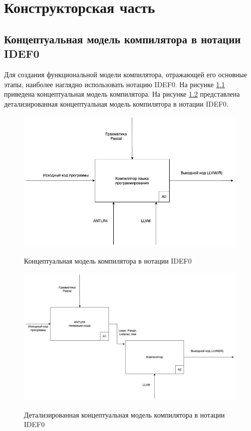 \chapter{Конструкторская часть}


\section{Концептуальная модель компилятора в нотации IDEF0}

Для создания функциональной модели компилятора, отражающей его основные этапы, наиболее наглядно использовать нотацию IDEF0. На рисунке \ref{fig:idef0-0} приведена концептуальная модель компилятора. На рисунке \ref{fig:idef0-1} представлена детализированная концептуальная модель компилятора в нотации IDEF0.

\begin{figure}[h!]
	\begin{center}
		{\includegraphics[scale = 0.5, angle=0]{../img/idef0/idef0-0.png}}
		\caption{Концептуальная модель компилятора в нотации IDEF0}
		\label{fig:idef0-0}
	\end{center}
\end{figure}


\begin{figure}[h!]
	\begin{center}
		{\includegraphics[scale = 0.4, angle=0]{../img/idef0/idef0-1.png}}
		\caption{Детализированная концептуальная модель компилятора в нотации IDEF0}
		\label{fig:idef0-1}
	\end{center}
\end{figure}

